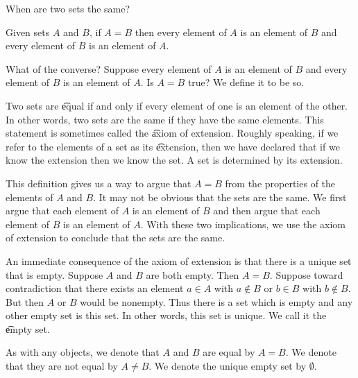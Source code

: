 

When are two sets the same?


Given sets $A$ and $B$, if $A = B$ then every element of $A$ is an element of $B$ and every element of $B$ is an element of $A$.

\begin{account}[Test]
\end{account}


What of the converse?
Suppose every element of $A$ is an element of $B$ and every element of $B$ is an element of $A$.
Is $A = B$ true?
We define it to be so.

Two sets are \t{equal} if and only if every element of one is an element of the other.
In other words, two sets are the same if they have the same elements.
This statement is sometimes called the \t{axiom of extension}.
Roughly speaking, if we refer to the elements of a set as its \t{extension}, then we have declared that if we know the extension then we know the set.
A set is determined by its extension.

This definition gives us a way to argue that $A = B$ from the properties of the elements of $A$ and $B$.
It may not be obvious that the sets are the same.
We first argue that each element of $A$ is an element of $B$ and then argue that each element of $B$ is an element of $A$.
With these two implications, we use the axiom of extension to conclude that the sets are the same.

An immediate consequence of the axiom of extension is that there is a unique set that is empty.
Suppose $A$ and $B$ are both empty.
Then $A = B$.
Suppose toward contradiction that there exists an element $a \in A$ with $a \not\in B$ or $b \in B$ with $b \not\in B$.
But then $A$ or $B$ would be nonempty.
Thus there is a set which is empty and any other empty set is this set.
In other words, this set is unique.
We call it the \t{empty set}.


As with any objects, we denote that $A$ and $B$ are equal
by $A = B$.
We denote that they are not equal by $A \neq B$.
We denote the unique empty set by $\emptyset$.


